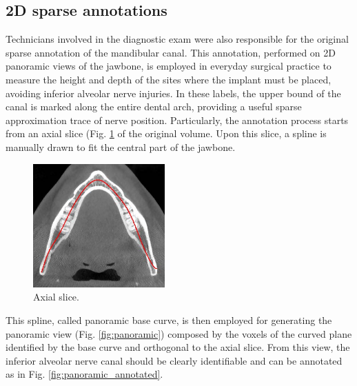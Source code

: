 \subsection{2D sparse annotations}
Technicians involved in the diagnostic exam were also responsible for the
original sparse annotation of the mandibular canal. This annotation, performed on
2D panoramic views of the jawbone, is employed in everyday surgical practice to
measure the height and depth of the sites where the implant must be placed,
avoiding inferior alveolar nerve injuries. In these labels, the upper bound of
the canal is marked along the entire dental arch, providing a useful sparse
approximation trace of nerve position. Particularly, the annotation process
starts from an axial slice (Fig. \ref{fig:axial-slice} of the original volume. Upon this slice, a spline is
manually drawn to fit the central part of the jawbone.

\begin{figure}[ht]
  \centering
  \includegraphics[width=0.45\textwidth]{Images/axial-slice.jpg}
  \caption{Axial slice.}
  \label{fig:axial-slice}
\end{figure}

This spline, called panoramic base curve, is then employed for generating the
panoramic view (Fig. \ref{fig:panoramic}) composed by the voxels of the curved
plane identified by the base curve and orthogonal to the axial slice. From this
view, the inferior alveolar nerve canal should be clearly identifiable and can
be annotated as in Fig. \ref{fig:panoramic_annotated}.

